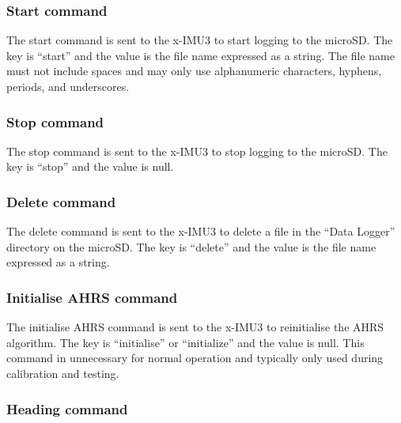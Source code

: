 \subsubsection{Start command}
\label{sec:startCommand}

The start command is sent to the x-IMU3 to start logging to the \ac{microSD}.  The key is \enquote{start} and the value is the file name expressed as a string.  The file name must not include spaces and may only use alphanumeric characters, hyphens, periods, and underscores.  


\subsubsection{Stop command}
\label{sec:stopCommand}

The stop command is sent to the x-IMU3 to stop logging to the \ac{microSD}.  The key is \enquote{stop} and the value is null.  


\subsubsection{Delete command}

The delete command is sent to the x-IMU3 to delete a file in the \enquote{Data Logger} directory on the \ac{microSD}.  The key is \enquote{delete} and the value is the file name expressed as a string.  


\subsubsection{Initialise \acs{AHRS} command}

The initialise \ac{AHRS} command is sent to the x-IMU3 to reinitialise the \ac{AHRS} algorithm.  The key is \enquote{initialise} or \enquote{initialize} and the value is null.  This command in unnecessary for normal operation and typically only used during calibration and testing.


\subsubsection{Heading command}

